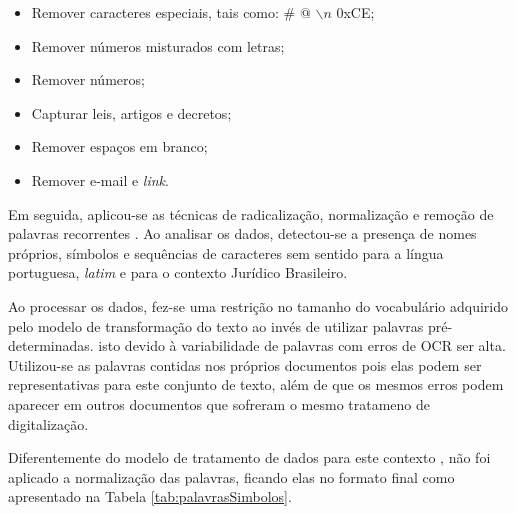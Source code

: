 \begin{itemize}
	\item Remover caracteres especiais, tais como: \# @ $\backslash n$ 0xCE;
    \item Remover números misturados com letras;
    \item Remover números;
    \item Capturar leis, artigos e decretos;
    \item Remover espaços em branco;
    \item Remover e-mail e \textit{link}.
\end{itemize}

Em seguida, aplicou-se as técnicas de radicalização, normalização \cite{singh_text_2016} e remoção de palavras recorrentes \cite{manning_introduction_2008}. Ao analisar os dados, detectou-se a presença de nomes próprios, símbolos e sequências de caracteres sem sentido para a língua portuguesa, \textit{latim} e para o contexto Jurídico Brasileiro.

Ao processar os dados, fez-se uma restrição no tamanho do vocabulário adquirido pelo modelo de transformação do texto ao invés de utilizar palavras pré-determinadas. isto devido à variabilidade de palavras com erros de OCR ser alta. Utilizou-se as palavras contidas nos próprios documentos pois elas podem ser representativas para este conjunto de texto, além de que os mesmos erros podem aparecer em outros documentos que sofreram o mesmo tratameno de digitalização.

Diferentemente do modelo de tratamento de dados para este contexto \cite{da_silva_document_2018}, não foi aplicado a normalização das palavras, ficando elas no formato final como apresentado na Tabela \ref{tab:palavrasSimbolos}.



